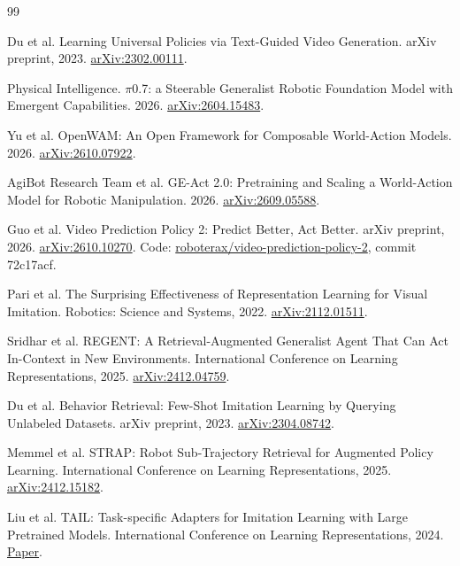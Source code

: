 \documentclass[11pt,a4paper]{article}
\begin{document}
\begin{thebibliography}{99}

Du et al. Learning Universal Policies via Text-Guided Video Generation. arXiv preprint, 2023. \href{https://arxiv.org/abs/2302.00111}{arXiv:2302.00111}.

Physical Intelligence. \ensuremath{\pi}0.7: a Steerable Generalist Robotic Foundation Model with Emergent Capabilities. 2026. \href{https://arxiv.org/abs/2604.15483}{arXiv:2604.15483}.

Yu et al. OpenWAM: An Open Framework for Composable World-Action Models. 2026. \href{https://arxiv.org/abs/2610.07922}{arXiv:2610.07922}.

AgiBot Research Team et al. GE-Act 2.0: Pretraining and Scaling a World-Action Model for Robotic Manipulation. 2026. \href{https://arxiv.org/abs/2609.05588}{arXiv:2609.05588}.

Guo et al. Video Prediction Policy 2: Predict Better, Act Better. arXiv preprint, 2026. \href{https://arxiv.org/abs/2610.10270}{arXiv:2610.10270}. Code: \href{https://github.com/roboterax/video-prediction-policy-2}{roboterax/video-prediction-policy-2}, commit 72c17acf.

Pari et al. The Surprising Effectiveness of Representation Learning for Visual Imitation. Robotics: Science and Systems, 2022. \href{https://arxiv.org/abs/2112.01511}{arXiv:2112.01511}.

Sridhar et al. REGENT: A Retrieval-Augmented Generalist Agent That Can Act In-Context in New Environments. International Conference on Learning Representations, 2025. \href{https://arxiv.org/abs/2412.04759}{arXiv:2412.04759}.

Du et al. Behavior Retrieval: Few-Shot Imitation Learning by Querying Unlabeled Datasets. arXiv preprint, 2023. \href{https://arxiv.org/abs/2304.08742}{arXiv:2304.08742}.

Memmel et al. STRAP: Robot Sub-Trajectory Retrieval for Augmented Policy Learning. International Conference on Learning Representations, 2025. \href{https://arxiv.org/abs/2412.15182}{arXiv:2412.15182}.

Liu et al. TAIL: Task-specific Adapters for Imitation Learning with Large Pretrained Models. International Conference on Learning Representations, 2024. \href{https://proceedings.iclr.cc/paper_files/paper/2024/hash/46e2b525da536030ec1589dddea01feb-Abstract-Conference.html}{Paper}.


\end{thebibliography}
\end{document}
